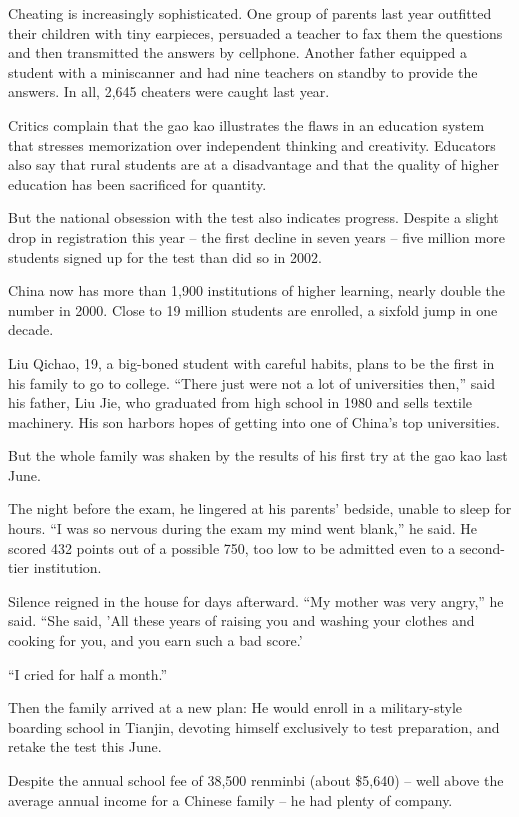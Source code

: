 ﻿\documentclass[12pt,a4paper,onecolumn]{article}
\begin{document}
Cheating is increasingly sophisticated. One group of parents last year outfitted their children with
tiny earpieces, persuaded a teacher to fax them the questions and then transmitted the answers by
cellphone. Another father equipped a student with a miniscanner and had nine teachers on standby to
provide the answers. In all, 2,645 cheaters were caught last year.

Critics complain that the gao kao illustrates the flaws in an education system that stresses
memorization over independent thinking and creativity. Educators also say that rural students are at
a disadvantage and that the quality of higher education has been sacrificed for quantity.

But the national obsession with the test also indicates progress. Despite a slight drop in
registration this year -- the first decline in seven years -- five million more students signed up
for the test than did so in 2002.

China now has more than 1,900 institutions of higher learning, nearly double the number in 2000.
Close to 19 million students are enrolled, a sixfold jump in one decade.

Liu Qichao, 19, a big-boned student with careful habits, plans to be the first in his family to go
to college. ``There just were not a lot of universities then,'' said his father, Liu Jie, who
graduated from high school in 1980 and sells textile machinery. His son harbors hopes of getting
into one of China's top universities.

But the whole family was shaken by the results of his first try at the gao kao last June.

The night before the exam, he lingered at his parents' bedside, unable to sleep for hours. ``I was
so nervous during the exam my mind went blank,'' he said. He scored 432 points out of a possible
750, too low to be admitted even to a second-tier institution.

Silence reigned in the house for days afterward. ``My mother was very angry,'' he said. ``She said,
'All these years of raising you and washing your clothes and cooking for you, and you earn such a
bad score.'

``I cried for half a month.''

Then the family arrived at a new plan: He would enroll in a military-style boarding school in
Tianjin, devoting himself exclusively to test preparation, and retake the test this June.

Despite the annual school fee of 38,500 renminbi (about \$5,640) -- well above the average annual
income for a Chinese family -- he had plenty of company.
\end{document}

